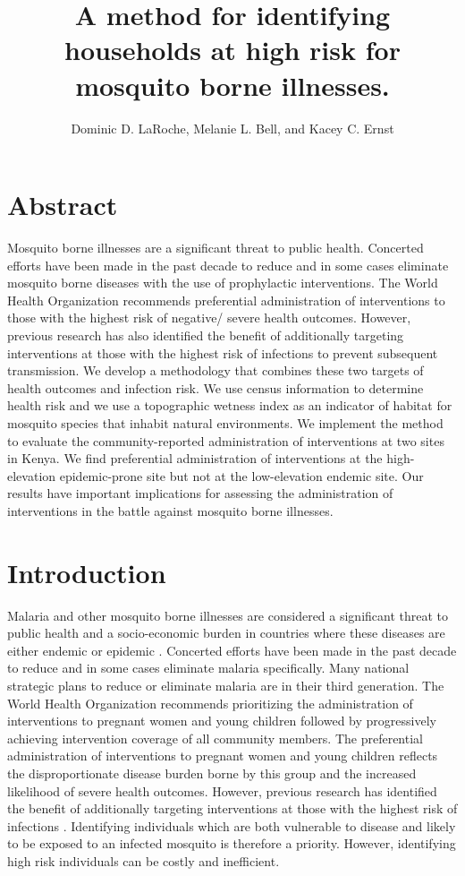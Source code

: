 \documentclass{article}\usepackage[]{graphicx}\usepackage[]{color}
\title{A method for identifying households at high risk for mosquito borne illnesses.}
\author{Dominic D. LaRoche, Melanie L. Bell, and Kacey C. Ernst}
\begin{document}
\maketitle







\section{Abstract}
Mosquito borne illnesses are a significant threat to public health. Concerted efforts have been made in the past decade to reduce and in some cases eliminate mosquito borne diseases with the use of prophylactic interventions. The World Health Organization recommends preferential administration of interventions to those with the highest risk of negative/ severe health outcomes. However,  previous research has also identified the benefit of additionally targeting interventions at those with the highest risk of infections to prevent subsequent transmission. We develop a methodology that combines these two targets of health outcomes and infection risk. We use census information to determine health risk and we use a topographic wetness index as an indicator of habitat for mosquito species that inhabit natural environments.  We implement the method to evaluate the community-reported administration of interventions at two sites in Kenya. We find preferential administration of interventions at the high-elevation epidemic-prone site but not at the low-elevation endemic site. Our results have important implications for assessing the administration of interventions in the battle against mosquito borne illnesses.


\section{Introduction}
Malaria and other mosquito borne illnesses are considered a significant threat to public health and a socio-economic burden in countries where these diseases are either endemic or epidemic \cite{Crouch}. Concerted efforts have been made in the past decade to reduce and in some cases eliminate malaria specifically. Many national strategic plans to reduce or eliminate malaria are in their third generation.  The World Health Organization recommends prioritizing the administration of interventions to pregnant women and young children followed by progressively achieving intervention coverage of all community members. The preferential administration of interventions to pregnant women and young children reflects the disproportionate disease burden borne by this group and the increased likelihood of severe health outcomes\cite{Bousema2012}. However,  previous research has identified the benefit of additionally targeting interventions at those with the highest risk of infections \cite{Schantz-Dunn2009}. Identifying individuals which are both vulnerable to disease and likely to be exposed to an infected mosquito is therefore a priority.  However, identifying high risk individuals can be costly and inefficient.\\
\end{document}
